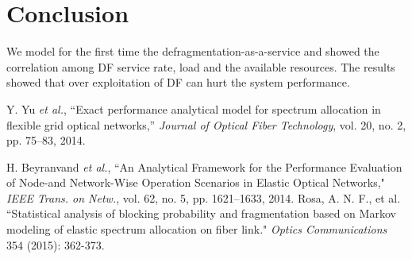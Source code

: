 \documentclass[letterpaper,10pt]{article}
\begin{document}
\section{Conclusion}
We model for the first time the defragmentation-as-a-service and showed the correlation among DF service rate, load and the available resources. The results showed that over exploitation of DF can hurt  the system performance. 
\vspace{-2mm}
\begin{thebibliography}{99}
 Y. Yu \emph{et al.}, ``Exact performance analytical model for spectrum allocation in flexible grid optical networks,'' \emph{Journal of Optical Fiber Technology}, vol. 20, no. 2, pp. 75--83, 2014.

 H. Beyranvand \emph{et al.}, ``An Analytical Framework for the Performance Evaluation of Node-and Network-Wise Operation Scenarios in Elastic Optical Networks," \emph{IEEE Trans. on Netw.}, vol. 62, no. 5, pp. 1621--1633, 2014.
Rosa, A. N. F., et al. ``Statistical analysis of blocking probability and fragmentation based on Markov modeling of elastic spectrum allocation on fiber link." \emph{Optics Communications} 354 (2015): 362-373.

\end{thebibliography}
\end{document}
